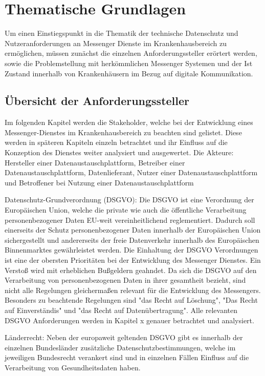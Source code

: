 \chapter{Thematische Grundlagen}\label{chapter:hintergrund}
Um einen Einstiegspunkt in die Thematik der technische Datenschutz und Nutzeranforderungen an Messenger Dienste im Krankenhausbereich zu ermöglichen, müssen zunächst die einzelnen Anforderungssteller erörtert werden, sowie die Problemstellung mit herkömmlichen Messenger Systemen und der Ist Zustand innerhalb von Krankenhäusern im Bezug auf digitale Kommunikation.

\section{Übersicht der Anforderungssteller}\label{section:ueda}
Im folgenden Kapitel werden die Stakeholder, welche bei der Entwicklung eines Messenger-Dienstes im Krankenhausbereich zu beachten sind gelistet. Diese werden in späteren Kapiteln einzeln betrachtet und ihr Einfluss auf die Konzeption des Dienstes weiter analysiert und ausgewertet. Die Akteure: Hersteller einer Datenaustauschplattform, Betreiber einer Datenaustauschplattform, Datenlieferant, Nutzer einer Datenaustauschplattform und Betroffener bei Nutzung einer Datenaustauschplattform

Datenschutz-Grundverordnung (DSGVO): Die DSGVO ist eine Verordnung der Europäischen Union, welche die private wie auch die öffentliche Verarbeitung personenbezogener Daten EU-weit vereinheitlichend reglementiert. Dadurch soll einerseits der Schutz personenbezogener Daten innerhalb der Europäischen Union sichergestellt und andererseits der freie Datenverkehr innerhalb des Europäischen Binnenmarktes gewährleistet werden. Die Einhaltung der DSGVO Verordnungen ist eine der obersten Prioritäten bei der Entwicklung des Messenger Dienstes. Ein Verstoß wird mit erheblichen Bußgeldern geahndet. Da sich die DSGVO auf den Verarbeitung von personenbezogenen Daten in ihrer gesamtheit bezieht, sind nicht alle Regelungen gleichermaßen relevant für die Entwicklung des Messengers. Besonders zu beachtende Regelungen sind "das Recht auf Löschung", "Das Recht auf Einverständis" und "das Recht auf Datenübertragung". Alle relevanten DSGVO Anforderungen werden in Kapitel x genauer betrachtet und analysiert.

Länderrecht: Neben der europaweit geltenden DSGVO gibt es innerhalb der einzelnen Bundesländer zusätzliche Datenschutzbestimmungen, welche im jeweiligen Bundesrecht verankert sind und in einzelnen Fällen Einfluss auf die Verarbeitung von Gesundheitsdaten haben.

